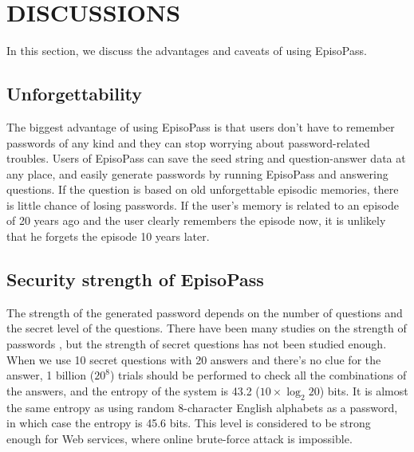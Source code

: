 \documentclass{sigchi}
\begin{document}
\section{DISCUSSIONS}

In this section, we discuss the advantages and caveats of
using EpisoPass.

\subsection{Unforgettability}

The biggest advantage of using EpisoPass is that
users don't have to remember passwords of any kind and
they can stop worrying about password-related troubles.
%
Users of EpisoPass can save the seed string and question-answer data
at any place, and easily generate passwords by running
EpisoPass and answering questions.
If the question is based on old unforgettable episodic memories,
there is little chance of losing passwords.
If the user's memory is related to an episode of 20 years ago and the user clearly
remembers the episode now, it is unlikely that he forgets the episode 10 years later.

\subsection{Security strength of EpisoPass}

The strength of the generated password depends on the number of
questions and the secret level of the questions.
%
There have been many studies on the strength of passwords
\cite{Hayashi:2011:DSP:1978942.1979326}%
\cite{Komanduri:2011:PPM:1978942.1979321}, %
but the strength of secret questions has not been studied enough.
%
%
When we use 10 secret questions with 20 answers and
there's no clue for the answer,
1 billion ($20^8$) trials should be performed to check
all the combinations of the answers,
and the entropy of the system is 43.2 ($10 \times \log_2 20$) bits.  %
%
%
It is almost the same entropy as using random 8-character English alphabets
as a password, in which case the entropy is 45.6 bits.
This level is considered to be strong enough for Web services,
where online brute-force attack is impossible\cite{Florencio:2007:SWP:1361419.1361429}.
\end{document}

